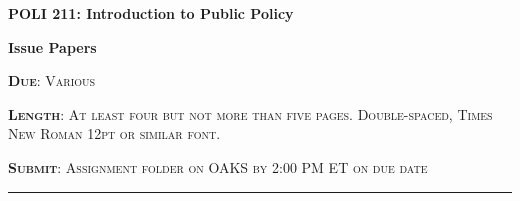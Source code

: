 \documentclass[11pt]{article}
\begin{document}
\begin{center}
\bigskip

{\bf{POLI 211: Introduction to Public Policy}}

{\bf{Issue Papers}}
\end{center} 

\noindent \textsc{{\bf{Due}}: Various}

\noindent \textsc{{\bf{Length}}: At least four but not more than five pages. Double-spaced, Times New Roman 12pt or similar font.}

\noindent \textsc{{\bf{Submit}}: Assignment folder on OAKS by 2:00 PM ET on due date}


\noindent\rule{\textwidth}{1pt}





  
\end{document}
